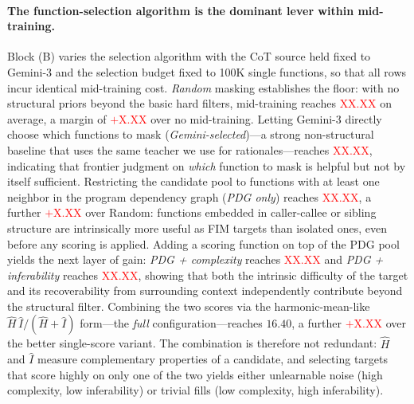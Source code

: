 \paragraph{The function-selection algorithm is the dominant lever within mid-training.}
Block (B) varies the selection algorithm with the CoT source held fixed
to Gemini-3 and the selection budget fixed to 100K single functions, so
that all rows incur identical mid-training cost.
\emph{Random} masking establishes the floor: with no structural priors
beyond the basic hard filters, mid-training reaches
\textcolor{red}{XX.XX} on average, a margin of \textcolor{red}{$+$X.XX}
over no mid-training. Letting Gemini-3 directly choose which functions
to mask (\emph{Gemini-selected})---a strong non-structural baseline that
uses the same teacher we use for rationales---reaches
\textcolor{red}{XX.XX}, indicating that frontier judgment on \emph{which}
function to mask is helpful but not by itself sufficient. Restricting the
candidate pool to functions with at least one neighbor in the program
dependency graph (\emph{PDG only}) reaches \textcolor{red}{XX.XX}, a
further \textcolor{red}{$+$X.XX} over Random: functions embedded in
caller-callee or sibling structure are intrinsically more useful as FIM
targets than isolated ones, even before any scoring is applied. Adding a
scoring function on top of the PDG pool yields the next layer of gain:
\emph{PDG + complexity} reaches \textcolor{red}{XX.XX} and
\emph{PDG + inferability} reaches \textcolor{red}{XX.XX}, showing that
both the intrinsic difficulty of the target and its recoverability from
surrounding context independently contribute beyond the structural
filter. Combining the two scores via the harmonic-mean-like
$\hat{H}\,\hat{I}/(\hat{H}+\hat{I})$ form---the \emph{full}
configuration---reaches $16.40$, a further \textcolor{red}{$+$X.XX} over
the better single-score variant. The combination is therefore not
redundant: $\hat{H}$ and $\hat{I}$ measure complementary properties of a
candidate, and selecting targets that score highly on only one of the
two yields either unlearnable noise (high complexity, low inferability)
or trivial fills (low complexity, high inferability).
